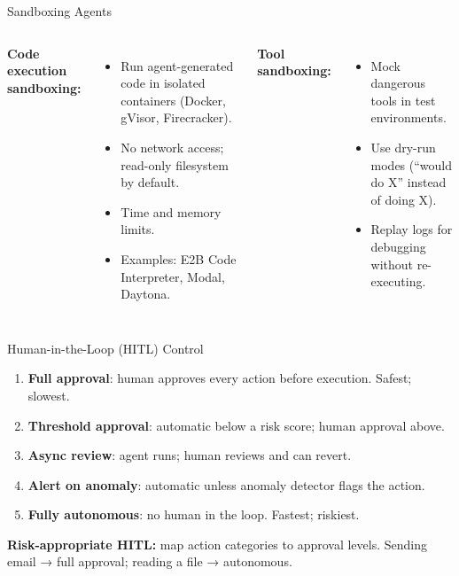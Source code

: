 \documentclass[aspectratio=169,10pt]{beamer}
\begin{document}
\begin{frame}{Sandboxing Agents}
  \begin{columns}[T]
      \textbf{Code execution sandboxing:}
      \begin{itemize}
        \item Run agent-generated code in isolated containers (Docker, gVisor, Firecracker).
        \item No network access; read-only filesystem by default.
        \item Time and memory limits.
        \item Examples: E2B Code Interpreter, Modal, Daytona.
      \end{itemize}
      \vspace{0.4em}
      \textbf{Tool sandboxing:}
      \begin{itemize}
        \item Mock dangerous tools in test environments.
        \item Use dry-run modes (``would do X'' instead of doing X).
        \item Replay logs for debugging without re-executing.
      \end{itemize}
  \end{columns}
\end{frame}

\begin{frame}{Human-in-the-Loop (HITL) Control}
  \begin{tcolorbox}[hitbox, title=HITL Design Levels]
    \begin{enumerate}
      \item \textbf{Full approval}: human approves every action before execution. Safest; slowest.
      \item \textbf{Threshold approval}: automatic below a risk score; human approval above.
      \item \textbf{Async review}: agent runs; human reviews and can revert.
      \item \textbf{Alert on anomaly}: automatic unless anomaly detector flags the action.
      \item \textbf{Fully autonomous}: no human in the loop. Fastest; riskiest.
    \end{enumerate}
  \end{tcolorbox}
  \vspace{0.3em}
  \textbf{Risk-appropriate HITL:} map action categories to approval levels.
  Sending email → full approval; reading a file → autonomous.
\end{frame}
\end{document}
